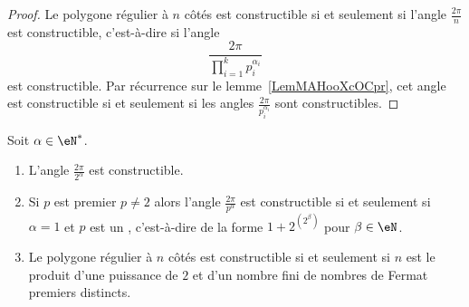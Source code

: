\begin{proof}
    Le polygone régulier à \( n\) côtés est constructible si et seulement si l'angle \( \frac{ 2\pi }{ n }\) est constructible, c'est-à-dire si l'angle
    \begin{equation}
        \frac{ 2\pi }{ \prod_{i=1}^kp_i^{\alpha_i} }
    \end{equation}
    est constructible. Par récurrence sur le lemme~\ref{LemMAHooXcOCpr}, cet angle est constructible si et seulement si les angles \( \frac{ 2\pi }{ p_i^{\alpha_i} }\) sont constructibles.
\end{proof}

\begin{theorem}    \label{ThoTWAooEsLjJu}
    Soit \( \alpha\in \eN^*\).
    \begin{enumerate}
        \item   \label{ItemFSEooONDFrSi}
            L'angle \( \frac{ 2\pi }{ 2^{\alpha} } \) est constructible.
        \item\label{ItemFSEooONDFrSii}
            Si \( p\) est premier \( p\neq 2\) alors l'angle \( \frac{ 2\pi }{ p^{\alpha} } \) est constructible si et seulement si \( \alpha=1\) et \( p\) est un , c'est-à-dire de la forme \( 1+2^{(2^{\beta})}\) pour \( \beta\in \eN\).
        \item\label{ItemFSEooONDFrSiii}
            Le polygone régulier à \( n\) côtés est constructible si et seulement si \( n \) est le produit d'une puissance de \( 2\) et d'un nombre fini de nombres de Fermat premiers distincts.
    \end{enumerate}
\end{theorem}

